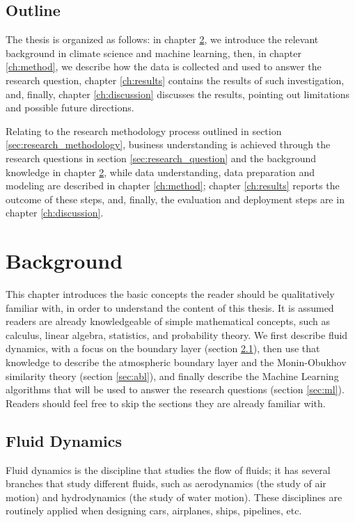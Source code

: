 \documentclass[12pt]{book}
\begin{document}
\section{Outline}
The thesis is organized as follows: in chapter \ref{ch:background}, we introduce the relevant background in climate science and machine learning, then, in chapter \ref{ch:method}, we describe how the data is collected and used to answer the research question, chapter \ref{ch:results} contains the results of such investigation, and, finally, chapter \ref{ch:discussion} discusses the results, pointing out limitations and possible future directions.

Relating to the research methodology process outlined in section \ref{sec:research_methodology}, business understanding is achieved through the research questions in section \ref{sec:research_question} and the background knowledge in chapter \ref{ch:background}, while data understanding, data preparation and modeling are described in chapter \ref{ch:method}; chapter \ref{ch:results} reports the outcome of these steps, and, finally, the evaluation and deployment steps are in chapter \ref{ch:discussion}.

\chapter{Background}
\label{ch:background}
This chapter introduces the basic concepts the reader should be qualitatively familiar with, in order to understand the content of this thesis. It is assumed readers are already knowledgeable of simple mathematical concepts, such as calculus, linear algebra, statistics, and probability theory. We first describe fluid dynamics, with a focus on the boundary layer (section \ref{sec:fluids}), then use that knowledge to describe the atmospheric boundary layer and the Monin-Obukhov similarity theory (section \ref{sec:abl}), and finally describe the Machine Learning algorithms that will be used to answer the research questions (section \ref{sec:ml}). Readers should feel free to skip the sections they are already familiar with.

\section{Fluid Dynamics}
\label{sec:fluids}
Fluid dynamics is the discipline that studies the flow of fluids; it has several branches that study different fluids, such as aerodynamics (the study of air motion) and hydrodynamics (the study of water motion). These disciplines are routinely applied when designing cars, airplanes, ships, pipelines, etc.
\end{document}

